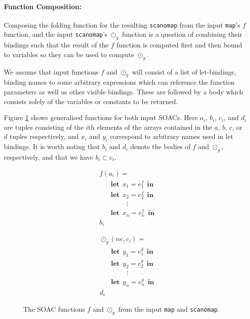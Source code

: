 \documentclass[11pt,bibliography=totocnumbered]{article}
\newcommand\lett{\phantom{-}\:\:\mathbf{let}\:\:}
\newcommand\inn{\:\:\mathbf{in}\:\:}
\begin{document}
\paragraph{Function Composition:}
\setcounter{equation}{0}
Composing the folding function for the resulting \texttt{scanomap} from the input \texttt{map}'s $f$ function, and the input \texttt{scanomap}'s $\odot_g$ function is a question of combining their
 bindings such that the result of the $f$ function is computed first and then bound to variables so they can be used to compute $\odot_g$.

We assume that input functions $f$ and $\odot_g$ will consist of a list of let-bindings, binding names to some arbitrary expressions which can reference the function parameters as well as
 other visible bindings. These are followed by a body which consists solely of the variables or constants to be returned.

 Figure \ref{fig:bothfuns} shows generalised functions for both
 input SOACs. Here $a_i$, $b_i$, $c_i$, and $d_i$ are tuples consisting of the $i$th elements of the arrays contained in the $a$, $b$, $c$, or $d$ tuples respectively, and $x_i$ and $y_i$ correspond
 to arbitrary names used in let bindings. It is worth noting that $b_i$ and $d_i$ denote the bodies of $f$ and $\odot_g$, respectively, and that we have $b_i \subset c_i$.
 \begin{figure}[hb!]

   \begin{mdframed}
 \begin{minipage}{0.5\linewidth}
     \centering

       \begin{align*}
         &f(a_i) = \\
         &\lett x_1 = e_1^f \inn\\
         &\lett x_2 = e_2^f \inn\\
         &\phantom{----}\vdots\\
         &\lett x_n = e_n^f \inn\\
         &b_i
       \end{align*}

     \label{fig:mapf}
 \end{minipage}
 \begin{minipage}{0.5\linewidth}
     \centering

     \begin{align*}
       &\odot_g(ne, c_i) = \\
       &\lett y_1 = e_1^g \inn\\
       &\lett y_2 = e_2^g \inn\\
       &\phantom{----}\vdots\\
       &\lett y_n = e_n^g \inn\\
       &d_i
     \end{align*}

     \label{fig:odotg}
   \end{minipage}

     \end{mdframed}
     \caption{The SOAC functions $f$ and $\odot_g$ from the input
       \texttt{map} and \texttt{scanomap}.}
     \label{fig:bothfuns}
\end{figure}
\end{document}

